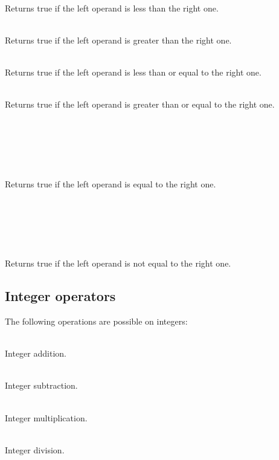 \begin{dlist}
  \item {}\\
    Returns true if the left operand is less than the right one.
  \item {}\\
    Returns true if the left operand is greater than the right one.
  \item {}\\
    Returns true if the left operand is less than or equal to the right one.
  \item {}\\
    Returns true if the left operand is greater than or equal to the right one.
  \item {}\\
    \\
    \\
    \\
    \\
    Returns true if the left operand is equal to the right one.
  \item {}\\
    \\
    \\
    \\
    \\
    Returns true if the left operand is not equal to the right one.
\end{dlist}

\subsection{Integer operators}

The following operations are possible on integers:

\begin{dlist}
  \item {} \\
    Integer addition.
  \item {} \\
    Integer subtraction.
  \item {} \\
    Integer multiplication.
  \item {} \\
    Integer division.
\end{dlist}

